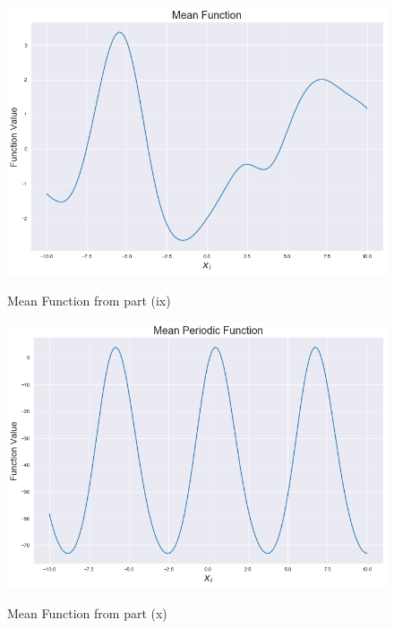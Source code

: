 \documentclass[twoside,11pt]{homework}
\DeclarePairedDelimiter{\2norm}{\lVert}{\rVert^2_2}
\newcommand{\1}[1]{\mathds{1}\left[#1\right]}
\begin{document}
\begin{figure}[H]
\centering
\caption{Mean Function from part (ix)}
\includegraphics[scale=0.35]{"../code/figures/part_xii_posterior"}
\label{fig:part_xii}
\end{figure}
\vspace{-0.2in}
\begin{figure}[H]
\centering
\caption{Mean Function from part (x)}
\includegraphics[scale=0.35]{"../code/figures/part_xii_periodic"}
\label{fig:part_xii_periodic}
\end{figure}
\end{document}
